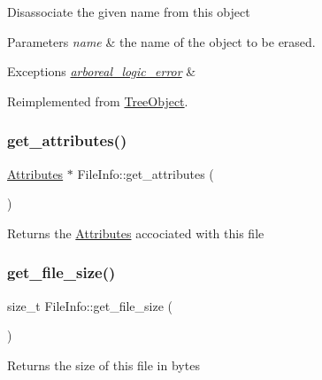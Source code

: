 Disassociate the given name from this object 
\begin{DoxyParams}{Parameters}
{\em name} & the name of the object to be erased. \\
\hline
\end{DoxyParams}

\begin{DoxyExceptions}{Exceptions}
{\em \mbox{\hyperlink{classarboreal__logic__error}{arboreal\+\_\+logic\+\_\+error}}} & \\
\hline
\end{DoxyExceptions}


Reimplemented from \mbox{\hyperlink{classTreeObject_a453b5df2a9ef7c6faad259900d574ee2}{Tree\+Object}}.

\mbox{\label{classFileInfo_a07f09582ef3c3beb105906d5c71234a5}} 
\subsubsection{\texorpdfstring{get\+\_\+attributes()}{get\_attributes()}}
{\footnotesize\ttfamily \mbox{\hyperlink{classAttributes}{Attributes}} $\ast$ File\+Info\+::get\+\_\+attributes (\begin{DoxyParamCaption}{ }\end{DoxyParamCaption})}

\begin{DoxyReturn}{Returns}
the \mbox{\hyperlink{classAttributes}{Attributes}} accociated with this file 
\end{DoxyReturn}
\mbox{\label{classFileInfo_aa07a5b95bfd41814b7fb2ee30a279c65}} 
\subsubsection{\texorpdfstring{get\+\_\+file\+\_\+size()}{get\_file\_size()}}
{\footnotesize\ttfamily size\+\_\+t File\+Info\+::get\+\_\+file\+\_\+size (\begin{DoxyParamCaption}{ }\end{DoxyParamCaption})}

\begin{DoxyReturn}{Returns}
the size of this file in bytes 
\end{DoxyReturn}
\mbox{\label{classFileInfo_a706117270bcf31739d7ce0aa0d79891f}} 
